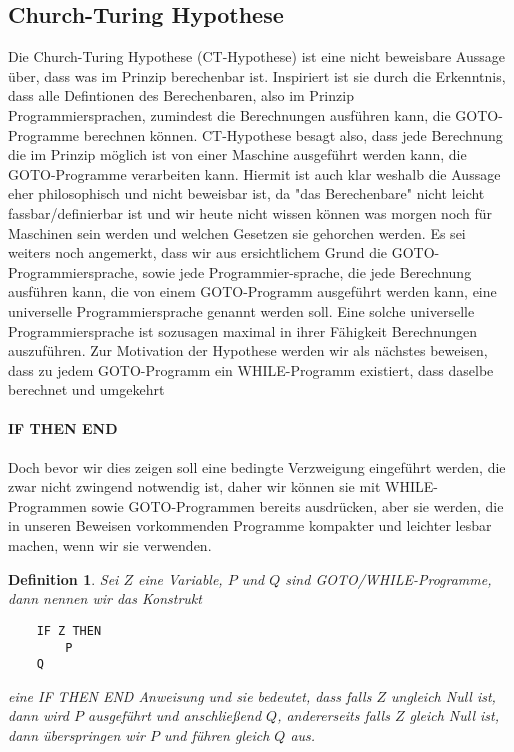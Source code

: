 \documentclass[11pt,a4paper,leqno]{report}
\newtheorem{definition}[theorem]{Definition}
\numberwithin{equation}{chapter}
\begin{document}
\subsection{Church-Turing Hypothese}
Die Church-Turing Hypothese (CT-Hypothese) ist eine nicht beweisbare Aussage über, dass was im Prinzip berechenbar ist. Inspiriert ist sie durch die Erkenntnis, dass alle Defintionen des Berechenbaren, also im Prinzip \\Programmiersprachen, zumindest die Berechnungen ausführen kann, die GOTO-Programme berechnen können. CT-Hypothese besagt also, dass jede Berechnung die im Prinzip möglich ist von einer Maschine ausgeführt werden kann, die GOTO-Programme verarbeiten kann. Hiermit ist auch klar weshalb die Aussage eher philosophisch und nicht beweisbar ist, da "das Berechenbare" nicht leicht fassbar/definierbar ist und wir heute nicht wissen können was morgen noch für Maschinen sein werden und welchen Gesetzen sie gehorchen werden. Es sei weiters noch angemerkt, dass wir aus ersichtlichem Grund die GOTO-Programmiersprache, sowie jede Programmier-sprache, die jede Berechnung ausführen kann, die von einem GOTO-Programm ausgeführt werden kann, eine universelle Programmiersprache genannt werden soll. Eine solche universelle Programmiersprache ist sozusagen maximal in ihrer Fähigkeit Berechnungen auszuführen. Zur Motivation der Hypothese werden wir als nächstes beweisen, dass zu jedem GOTO-Programm ein WHILE-Programm existiert, dass daselbe berechnet und umgekehrt
\paragraph{IF THEN END} Doch bevor wir dies zeigen soll eine bedingte Verzweigung eingeführt werden, die zwar nicht zwingend notwendig ist, daher wir können sie mit WHILE-Programmen sowie GOTO-Programmen bereits ausdrücken, aber sie werden, die in unseren Beweisen vorkommenden Programme kompakter und leichter lesbar machen, wenn wir sie verwenden.
\begin{definition}
Sei $Z$ eine Variable, $P$ und $Q$ sind GOTO/WHILE-Programme, dann nennen wir das Konstrukt
	\begin{lstlisting}
	IF Z THEN
		P
	Q
	\end{lstlisting}
eine IF THEN END Anweisung und sie bedeutet, dass falls $Z$ ungleich Null ist, dann wird $P$ ausgeführt und anschließend $Q$, andererseits falls $Z$ gleich Null ist, dann überspringen wir $P$ und führen gleich $Q$ aus.
\end{definition}
\end{document}
